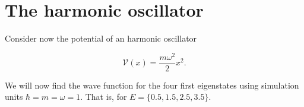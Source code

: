 \section{The harmonic oscillator}

Consider now the potential of an harmonic oscillator

\begin{equation}
  \label{eq:harm}
  \mathcal V(x) = \frac{m \omega^2}{2}x^2.
\end{equation}

We will now find the wave function for the four first eigenstates using simulation units $\hbar = m = \omega = 1$. That is, for $E= \{0.5,1.5,2.5,3.5\}$. 
